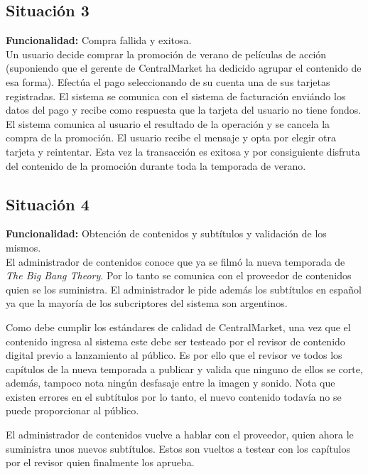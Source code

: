 \documentclass[11pt, a4paper, spanish]{article}
\begin{document}
\subsection{Situaci\'on 3}

	\textbf{Funcionalidad:} Compra fallida y exitosa.\\

        Un usuario decide comprar la promoci\'on de verano de pel\'iculas de acci\'on (suponiendo que el gerente de CentralMarket ha dedicido agrupar el     
    contenido de esa forma). Efect\'ua el pago seleccionando de su cuenta una de sus tarjetas registradas. El sistema se comunica con el sistema de 
    facturaci\'on envi\'ando los datos del pago y recibe como respuesta que la tarjeta del usuario no tiene fondos. El sistema comunica al usuario el 
    resultado de la operaci\'on y se cancela la compra de la promoci\'on. El usuario recibe el mensaje y opta por elegir otra tarjeta y reintentar. Esta 
    vez la transacci\'on es exitosa y por consiguiente disfruta del contenido de la promoci\'on durante toda la temporada de verano.

\subsection{Situaci\'on 4}

	\textbf{Funcionalidad:} Obtenci\'on de contenidos y subt\'itulos y validaci\'on de los mismos.\\

        El administrador de contenidos conoce que ya se film\'o la nueva temporada de \emph{The Big Bang Theory}. Por lo tanto se comunica con el 
   proveedor de contenidos quien se los suministra. El administrador le pide adem\'as los subt\'itulos en espa\~{n}ol ya que la mayor\'ia de los subcriptores del 
   sistema son argentinos.

        Como debe cumplir los est\'andares de calidad de CentralMarket, una vez que el contenido ingresa al sistema este debe ser testeado por el revisor 
   de contenido digital previo a lanzamiento al p\'ublico. Es por ello que el revisor ve todos los cap\'itulos de la nueva temporada a publicar y valida 
   que ninguno de ellos se corte, adem\'as, tampoco nota ning\'un desfasaje entre la imagen y sonido. Nota que existen errores en el subt\'itulos por lo 
   tanto, el nuevo contenido todav\'ia no se puede proporcionar al p\'ublico.
   
      El administrador de contenidos vuelve a hablar con el proveedor, quien ahora le suministra unos nuevos subt\'itulos. Estos son vueltos a testear 
   con los cap\'itulos por el revisor quien finalmente los aprueba.
\end{document}
